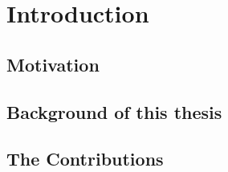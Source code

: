 
\chapter{Introduction}  %

\ifpdf
    \graphicspath{{Chapter1/Figs/Raster/}{Chapter1/Figs/PDF/}{Chapter1/Figs/}}
\else
    \graphicspath{{Chapter1/Figs/Vector/}{Chapter1/Figs/}}
\fi


\section{Motivation} %



\section{Background of this thesis} %



\section{The Contributions}  %
